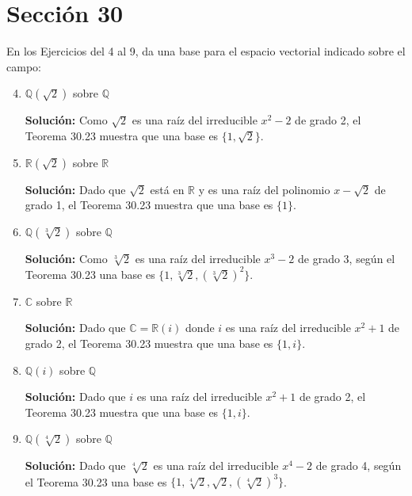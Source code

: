 


\section*{Sección 30}


En los Ejercicios del 4 al 9, da una base para el espacio vectorial indicado sobre el campo:

\begin{enumerate}
\setcounter{enumi}{3}
    \item \( \mathbb{Q}(\sqrt{2}) \) sobre \( \mathbb{Q} \)
    
    \textbf{Solución:} Como \( \sqrt{2} \) es una raíz del irreducible \( x^2 - 2 \) de grado 2, el Teorema 30.23 muestra que una base es \(\{1, \sqrt{2}\}\).

    \item \( \mathbb{R}(\sqrt{2}) \) sobre \( \mathbb{R} \)

    \textbf{Solución:} Dado que \( \sqrt{2} \) está en \( \mathbb{R} \) y es una raíz del polinomio \(x - \sqrt{2}\) de grado 1, el Teorema 30.23 muestra que una base es \(\{1\}\).

    \item \( \mathbb{Q}(\sqrt[3]{2}) \) sobre \( \mathbb{Q} \)

    \textbf{Solución:} Como \( \sqrt[3]{2} \) es una raíz del irreducible \(x^3 - 2\) de grado 3, según el Teorema 30.23 una base es \(\{1, \sqrt[3]{2}, (\sqrt[3]{2})^2\}\).

    \item \( \mathbb{C} \) sobre \( \mathbb{R} \)

    \textbf{Solución:} Dado que \( \mathbb{C} = \mathbb{R}(i) \) donde \( i \) es una raíz del irreducible \(x^2 + 1\) de grado 2, el Teorema 30.23 muestra que una base es \(\{1, i\}\).

    \item \( \mathbb{Q}(i) \) sobre \( \mathbb{Q} \)

    \textbf{Solución:} Dado que \( i \) es una raíz del irreducible \(x^2 + 1\) de grado 2, el Teorema 30.23 muestra que una base es \(\{1, i\}\).

    \item \( \mathbb{Q}(\sqrt[4]{2}) \) sobre \( \mathbb{Q} \)

    \textbf{Solución:} Dado que \( \sqrt[4]{2} \) es una raíz del irreducible \(x^4 - 2\) de grado 4, según el Teorema 30.23 una base es \(\{1, \sqrt[4]{2}, \sqrt{2}, (\sqrt[4]{2})^3\}\).

\end{enumerate}

